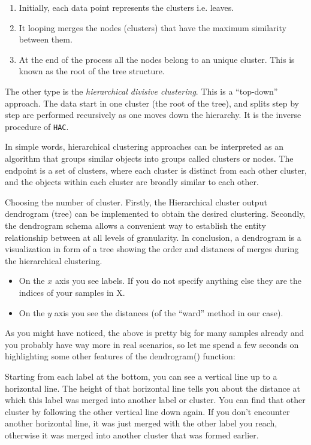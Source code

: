 \documentclass[fleqn,usenatbib]{mnras}
\begin{document}
\begin{enumerate}
\item Initially, each data point represents the clusters i.e. leaves.
\item It looping merges the nodes (clusters) that have the maximum similarity
  between them.
\item At the end of the process all the nodes belong to an unique cluster. This is
  known as the root of the tree structure.
 \end{enumerate}


The other type is the \textit{hierarchical divisive clustering}. This is a ``top-down''
approach. The data start in one cluster (the root of the tree), and splits step by step
are performed recursively as one moves down the hierarchy. It is the inverse procedure
of \texttt{HAC}.

In simple words, hierarchical clustering approaches can be interpreted  as an
algorithm that groups similar objects into groups called clusters or nodes.
The endpoint is a set of clusters, where each cluster is distinct from each other cluster,
and the objects within each cluster are broadly similar to each other.


Choosing the number of cluster. Firstly, the Hierarchical cluster output dendrogram (tree)
can be implemented to obtain the desired clustering. Secondly, the dendrogram schema allows
a convenient way to establish the entity relationship between at all levels of granularity.
In conclusion, a dendrogram is a visualization in form of a tree showing the order
and distances of merges during the hierarchical clustering.

\begin{itemize}
  
     \item On the $x$ axis you see labels. If you do not specify anything else they
       are the indices of your samples in X.
     \item On the $y$ axis you see the distances (of the ``ward'' method in our case).
       
\end{itemize}



As you might have noticed, the above is pretty big for many samples already and you
probably have way more in real scenarios, so let me spend a few seconds on highlighting
some other features of the dendrogram() function:


Starting from each label at the bottom, you can see a vertical line up to a
horizontal line. The height of that horizontal line tells you about the distance
at which this label was merged into another label or cluster. You can find that
other cluster by following the other vertical line down again. If you don't
encounter another horizontal line, it was just merged with the other label
you reach, otherwise it was merged into another cluster that was formed earlier.
\end{document}

